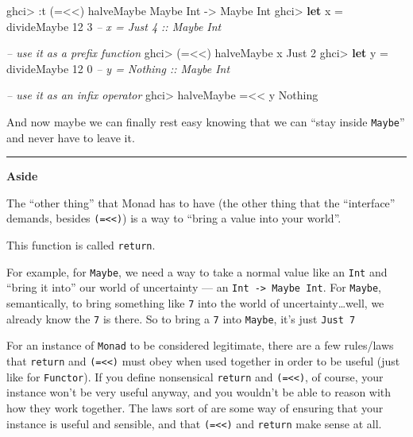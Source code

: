 \documentclass[]{article}
\newenvironment{Shaded}{}{}
\newcommand{\KeywordTok}[1]{\textcolor[rgb]{0.00,0.44,0.13}{\textbf{{#1}}}}
\newcommand{\DataTypeTok}[1]{\textcolor[rgb]{0.56,0.13,0.00}{{#1}}}
\newcommand{\DecValTok}[1]{\textcolor[rgb]{0.25,0.63,0.44}{{#1}}}
\newcommand{\CommentTok}[1]{\textcolor[rgb]{0.38,0.63,0.69}{\textit{{#1}}}}
\newcommand{\OtherTok}[1]{\textcolor[rgb]{0.00,0.44,0.13}{{#1}}}
\newcommand{\FunctionTok}[1]{\textcolor[rgb]{0.02,0.16,0.49}{{#1}}}
\newcommand{\NormalTok}[1]{{#1}}
\begin{document}
\begin{Shaded}
\begin{Highlighting}[]
\NormalTok{ghci}\FunctionTok{>} \FunctionTok{:}\NormalTok{t (}\FunctionTok{=<<}\NormalTok{) halveMaybe}
\DataTypeTok{Maybe} \DataTypeTok{Int} \OtherTok{->} \DataTypeTok{Maybe} \DataTypeTok{Int}
\NormalTok{ghci}\FunctionTok{>} \KeywordTok{let} \NormalTok{x }\FunctionTok{=} \NormalTok{divideMaybe }\DecValTok{12} \DecValTok{3}     \CommentTok{-- x = Just 4 :: Maybe Int}

\CommentTok{-- use it as a prefix function}
\NormalTok{ghci}\FunctionTok{>} \NormalTok{(}\FunctionTok{=<<}\NormalTok{) halveMaybe x}
\DataTypeTok{Just} \DecValTok{2}
\NormalTok{ghci}\FunctionTok{>} \KeywordTok{let} \NormalTok{y }\FunctionTok{=} \NormalTok{divideMaybe }\DecValTok{12} \DecValTok{0}     \CommentTok{-- y = Nothing :: Maybe Int}

\CommentTok{-- use it as an infix operator}
\NormalTok{ghci}\FunctionTok{>} \NormalTok{halveMaybe }\FunctionTok{=<<} \NormalTok{y}
\DataTypeTok{Nothing}
\end{Highlighting}
\end{Shaded}

And now maybe we can finally rest easy knowing that we can ``stay inside
\texttt{Maybe}'' and never have to leave it.

\begin{center}\rule{0.5\linewidth}{\linethickness}\end{center}

\textbf{Aside}

The ``other thing'' that Monad has to have (the other thing that the
``interface'' demands, besides \texttt{(=\textless{}\textless{})}) is a
way to ``bring a value into your world''.

This function is called \texttt{return}.

For example, for \texttt{Maybe}, we need a way to take a normal value
like an \texttt{Int} and ``bring it into'' our world of uncertainty ---
an \texttt{Int\ -\textgreater{}\ Maybe\ Int}. For \texttt{Maybe},
semantically, to bring something like \texttt{7} into the world of
uncertainty\ldots{}well, we already know the \texttt{7} is there. So to
bring a \texttt{7} into \texttt{Maybe}, it's just \texttt{Just\ 7}

For an instance of \texttt{Monad} to be considered legitimate, there are
a few rules/laws that \texttt{return} and
\texttt{(=\textless{}\textless{})} must obey when used together in order
to be useful (just like for \texttt{Functor}). If you define nonsensical
\texttt{return} and \texttt{(=\textless{}\textless{})}, of course, your
instance won't be very useful anyway, and you wouldn't be able to reason
with how they work together. The laws sort of are some way of ensuring
that your instance is useful and sensible, and that
\texttt{(=\textless{}\textless{})} and \texttt{return} make sense at
all.
\end{document}
